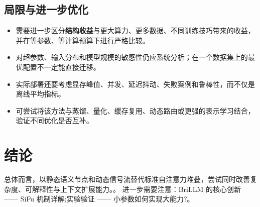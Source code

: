 \documentclass[UTF8,11pt,a4paper]{ctexart}
\newcommand{\term}[1]{\textbf{\textcolor{mainblue}{#1}}}
\begin{document}
\subsection{局限与进一步优化}
\begin{itemize}
\item 需要进一步区分\term{结构收益}与更大算力、更多数据、不同训练技巧带来的收益，并在等参数、等计算预算下进行严格比较。
\item 对超参数、输入分布和模型规模的敏感性仍应系统分析；在一个数据集上的最优配置不一定能直接迁移。
\item 实际部署还要考虑显存峰值、并发、延迟抖动、失败案例和鲁棒性，而不仅是离线平均指标。
\item 可尝试将该方法与蒸馏、量化、缓存复用、动态路由或更强的表示学习结合，验证不同优化是否互补。
\end{itemize}

\section{结论}
总体而言，以静态语义节点和动态信号流替代标准自注意力堆叠，尝试同时改善复杂度、可解释性与上下文扩展能力。。 进一步需要注意：BriLLM 的核心创新 —— SiFu 机制详解;实验验证 —— 小参数如何实现大能力?。
\end{document}
